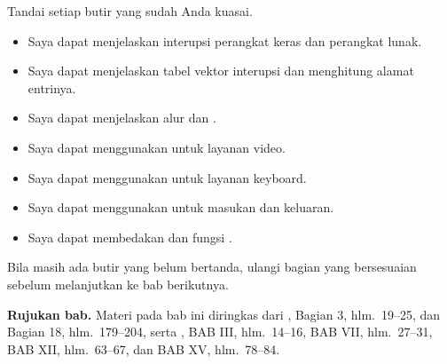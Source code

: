 \begin{checklistbox}
\vspace{1.1em}
Tandai setiap butir yang sudah Anda kuasai.

\begin{itemize}
    \item[\checkbox] Saya dapat menjelaskan interupsi perangkat keras
          dan perangkat lunak.
    \item[\checkbox] Saya dapat menjelaskan tabel vektor interupsi
          dan menghitung alamat entrinya.
    \item[\checkbox] Saya dapat menjelaskan alur  dan
          .
    \item[\checkbox] Saya dapat menggunakan  untuk
          layanan video.
    \item[\checkbox] Saya dapat menggunakan  untuk
          layanan keyboard.
    \item[\checkbox] Saya dapat menggunakan  untuk
          masukan dan keluaran.
    \item[\checkbox] Saya dapat membedakan  dan
           fungsi .
\end{itemize}

\vspace{0.4em}
Bila masih ada butir yang belum bertanda, ulangi bagian yang
bersesuaian sebelum melanjutkan ke bab berikutnya.
\end{checklistbox}

\begin{infobox}
\vspace{1.1em}
\textbf{Rujukan bab.} Materi pada bab ini diringkas dari
\cite{gunawan2019}, Bagian 3, hlm.~19--25, dan Bagian 18,
hlm.~179--204, serta \cite{sto2001}, BAB III, hlm.~14--16,
BAB VII, hlm.~27--31, BAB XII, hlm.~63--67, dan BAB XV,
hlm.~78--84.
\end{infobox}
